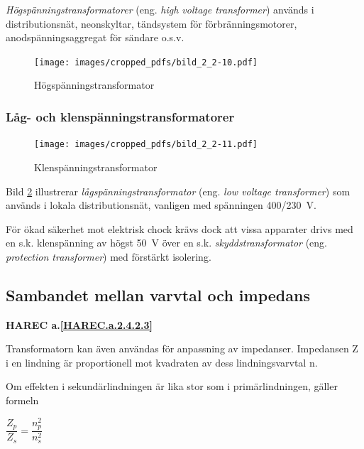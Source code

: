 \emph{Högspänningstransformatorer} (eng. \emph{high voltage transformer})
används i distributionsnät, neonskyltar, tändsystem för förbränningsmotorer,
anodspänningsaggregat för sändare o.s.v.

\begin{figure}[ht]
\begin{center}
\texttt{[image: images/cropped\_pdfs/bild\_2\_2-10.pdf]}
\caption{Högspänningstransformator}
\label{fig:BildII2-10}
\end{center}
\end{figure}

\subsubsection{Låg- och klenspänningstransformatorer}

\begin{figure}[ht]
\begin{center}
\texttt{[image: images/cropped\_pdfs/bild\_2\_2-11.pdf]}
\caption{Klenspänningstransformator}
\label{fig:BildII2-11}
\end{center}
\end{figure}

Bild \ref{fig:BildII2-11} illustrerar \emph{lågspänningstransformator} (eng.
\emph{low voltage transformer}) som används i lokala distributionsnät,
vanligen med spänningen 400/230~V.

För ökad säkerhet mot elektrisk chock krävs dock att vissa
apparater drivs med en s.k. klenspänning av högst 50~V över en s.k.
\emph{skyddstransformator} (eng. \emph{protection transformer}) med förstärkt
isolering.

\subsection{Sambandet mellan varvtal och impedans}
\textbf{HAREC a.\ref{HAREC.a.2.4.2.3}\label{myHAREC.a.2.4.2.3}}

Transformatorn kan även användas för anpassning av impedanser.
Impedansen Z i en lindning är proportionell mot kvadraten av dess
lindningsvarvtal n.

Om effekten i sekundärlindningen är lika stor som i primärlindningen, gäller
formeln

\(\dfrac{Z_p}{Z_s} = \dfrac{n_p^2}{n_s^2}\)
